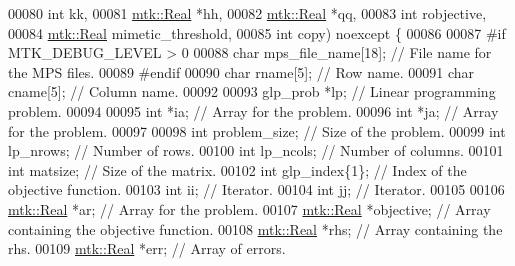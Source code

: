 \begin{DoxyCode}
00080                                                    \textcolor{keywordtype}{int} kk,
00081                                                    \hyperlink{group__c01-roots_gac080bbbf5cbb5502c9f00405f894857d}{mtk::Real} *hh,
00082                                                    \hyperlink{group__c01-roots_gac080bbbf5cbb5502c9f00405f894857d}{mtk::Real} *qq,
00083                                                    \textcolor{keywordtype}{int} robjective,
00084                                                    \hyperlink{group__c01-roots_gac080bbbf5cbb5502c9f00405f894857d}{mtk::Real} mimetic\_threshold,
00085                                                    \textcolor{keywordtype}{int} copy) noexcept \{
00086 
00087 \textcolor{preprocessor}{  #if MTK\_DEBUG\_LEVEL > 0}
00088   \textcolor{keywordtype}{char} mps\_file\_name[18]; \textcolor{comment}{// File name for the MPS files.}
00089 \textcolor{preprocessor}{  #endif}
00090   \textcolor{keywordtype}{char} rname[5];          \textcolor{comment}{// Row name.}
00091   \textcolor{keywordtype}{char} cname[5];          \textcolor{comment}{// Column name.}
00092 
00093   glp\_prob *lp; \textcolor{comment}{// Linear programming problem.}
00094 
00095   \textcolor{keywordtype}{int} *ia;  \textcolor{comment}{// Array for the problem.}
00096   \textcolor{keywordtype}{int} *ja;  \textcolor{comment}{// Array for the problem.}
00097 
00098   \textcolor{keywordtype}{int} problem\_size; \textcolor{comment}{// Size of the problem.}
00099   \textcolor{keywordtype}{int} lp\_nrows;     \textcolor{comment}{// Number of rows.}
00100   \textcolor{keywordtype}{int} lp\_ncols;     \textcolor{comment}{// Number of columns.}
00101   \textcolor{keywordtype}{int} matsize;      \textcolor{comment}{// Size of the matrix.}
00102   \textcolor{keywordtype}{int} glp\_index\{1\}; \textcolor{comment}{// Index of the objective function.}
00103   \textcolor{keywordtype}{int} ii;           \textcolor{comment}{// Iterator.}
00104   \textcolor{keywordtype}{int} jj;           \textcolor{comment}{// Iterator.}
00105 
00106   \hyperlink{group__c01-roots_gac080bbbf5cbb5502c9f00405f894857d}{mtk::Real} *ar;            \textcolor{comment}{// Array for the problem.}
00107   \hyperlink{group__c01-roots_gac080bbbf5cbb5502c9f00405f894857d}{mtk::Real} *objective;     \textcolor{comment}{// Array containing the objective function.}
00108   \hyperlink{group__c01-roots_gac080bbbf5cbb5502c9f00405f894857d}{mtk::Real} *rhs;           \textcolor{comment}{// Array containing the rhs.}
00109   \hyperlink{group__c01-roots_gac080bbbf5cbb5502c9f00405f894857d}{mtk::Real} *err;           \textcolor{comment}{// Array of errors.}

\end{DoxyCode}
